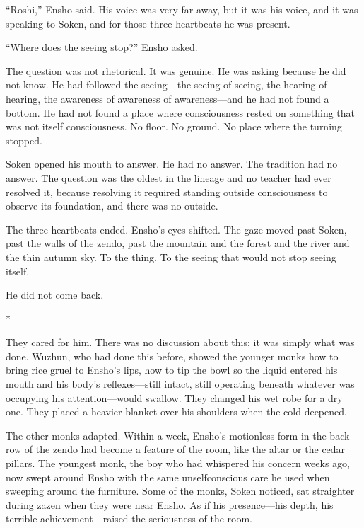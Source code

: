 ``Roshi,'' Ensho said. His voice was very far away, but it was his voice, and it was speaking to Soken, and for those three heartbeats he was present.

``Where does the seeing stop?'' Ensho asked.

The question was not rhetorical. It was genuine. He was asking because he did not know. He had followed the seeing---the seeing of seeing, the hearing of hearing, the awareness of awareness of awareness---and he had not found a bottom. He had not found a place where consciousness rested on something that was not itself consciousness. No floor. No ground. No place where the turning stopped.

Soken opened his mouth to answer. He had no answer. The tradition had no answer. The question was the oldest in the lineage and no teacher had ever resolved it, because resolving it required standing outside consciousness to observe its foundation, and there was no outside.

The three heartbeats ended. Ensho's eyes shifted. The gaze moved past Soken, past the walls of the zendo, past the mountain and the forest and the river and the thin autumn sky. To the thing. To the seeing that would not stop seeing itself.

He did not come back.

\begin{center}
*\quad*\quad*
\end{center}

They cared for him. There was no discussion about this; it was simply what was done. Wuzhun, who had done this before, showed the younger monks how to bring rice gruel to Ensho's lips, how to tip the bowl so the liquid entered his mouth and his body's reflexes---still intact, still operating beneath whatever was occupying his attention---would swallow. They changed his wet robe for a dry one. They placed a heavier blanket over his shoulders when the cold deepened.

The other monks adapted. Within a week, Ensho's motionless form in the back row of the zendo had become a feature of the room, like the altar or the cedar pillars. The youngest monk, the boy who had whispered his concern weeks ago, now swept around Ensho with the same unselfconscious care he used when sweeping around the furniture. Some of the monks, Soken noticed, sat straighter during zazen when they were near Ensho. As if his presence---his depth, his terrible achievement---raised the seriousness of the room.

